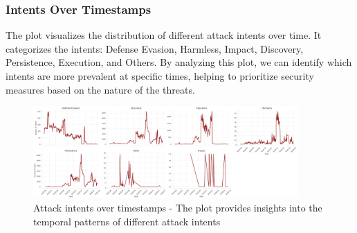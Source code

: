         \subsubsection{Intents Over Timestamps \\}
        
            The plot visualizes the distribution of different attack intents over time. It categorizes the intents: Defense Evasion, Harmless, Impact, Discovery, Persistence, Execution, and Others. By analyzing this plot, we can identify which intents are more prevalent at specific times, helping to prioritize security measures based on the nature of the threats.

            \begin{figure}[H]
                \centering
                \includegraphics[width=0.9\textwidth]{../figures/plots/section1/intents_over_timestamps.png}
                \caption{Attack intents over timestamps - The plot provides insights into the temporal patterns of different attack intents}
                \label{fig:intents_over_timestamps}
            \end{figure}
            
    \clearpage %

